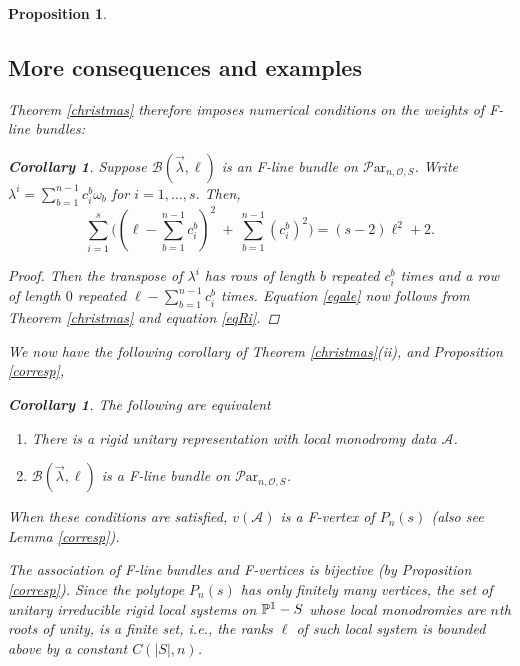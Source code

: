 \documentclass[11pt]{amsart}
\newcommand\ma{\mathcal{A}}
\newcommand\Par{\mathcal{P}\text{ar} }
\newtheorem{corollary}[theorem]{Corollary}
\newtheorem{proposition}[theorem]{Proposition}
\numberwithin{theorem}{subsection}
\begin{document}
{\begin{proposition}
\subsection{More consequences and examples}
Theorem \ref{christmas} therefore imposes numerical conditions on the weights of F-line bundles:
\begin{corollary}\label{katzkatz}
Suppose $\mathcal{B}(\vec{\lambda},\ell)$ is an F-line bundle on $\Par_{n,\mathcal{O},S}$. Write $\lambda^i=\sum_{b=1}^{n-1}c^b_i\omega_b$ for $i=1,\dots,s$. Then,
\begin{equation}\label{egale}
\sum_{i=1}^s \bigl((\ell-\sum_{b=1}^{n-1} c^b_i)^2 \ + \ \sum_{b=1}^{n-1}(c^b_i)^2\bigr) =(s-2)\ell^2+2.
\end{equation}
\end{corollary}
\begin{proof}
Then the transpose of $\lambda^i$ has rows of length $b$ repeated $c^b_i$ times and a row of length $0$ repeated $\ell-\sum_{b=1}^{n-1} c^b_i$ times. Equation \eqref{egale} now follows from Theorem \ref{christmas} and equation \eqref{eqRi}.
\end{proof}










\iffalse

We now have the following corollary of Theorem \ref{christmas}(ii), and Proposition \ref{corresp},
\begin{corollary}\label{bounded}
The following are equivalent
\begin{enumerate}
\item There is a rigid unitary representation with  local monodromy data $\mathcal{A}$.
\item $\mathcal{B}(\vec{\lambda},\ell)$ is a F-line bundle on $\Par_{n,{\mathcal{O}},S}$.
\end{enumerate}
When these conditions are satisfied, $v(\ma)$ is a F-vertex of $P_n(s)$ (also see Lemma \ref{corresp}).

The association of F-line bundles and F-vertices is bijective (by Proposition \ref{corresp}). Since the polytope $P_n(s)$ has only finitely many vertices, the set of  unitary irreducible rigid local systems on $\Bbb{P}^1-S$ whose local monodromies are $n$th
roots of unity, is a finite set, i.e., the ranks $\ell$ of such local system is bounded above by a constant $C(|S|,n)$.
\end{corollary}


\end{proposition}}
\end{document}
